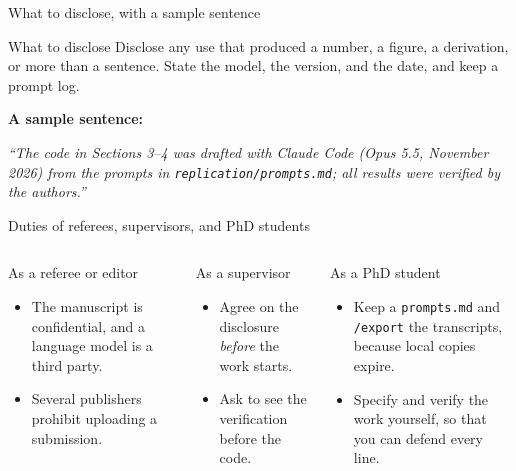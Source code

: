 \documentclass[aspectratio=169,10pt]{beamer}
\begin{document}
\begin{frame}{What to disclose, with a sample sentence}
\begin{block}{What to disclose}
Disclose any use that produced a number, a figure, a derivation, or more than a sentence. State the model, the version, and the date, and keep a prompt log.
\end{block}

\vspace{1.3em}
\textbf{A sample sentence:}

\vspace{0.3em}
{\itshape ``The code in Sections 3--4 was drafted with Claude Code (Opus 5.5, November 2026) from the prompts in \texttt{replication/prompts.md}; all results were verified by the authors.''}
\end{frame}

\begin{frame}{Duties of referees, supervisors, and PhD students}
\begin{columns}[T]
\begin{block}{As a referee or editor}
\begin{itemize}\itemsep5pt
  \item The manuscript is confidential, and a language model is a third party.
  \item Several publishers prohibit uploading a submission.
\end{itemize}
\end{block}
\begin{block}{As a supervisor}
\begin{itemize}\itemsep5pt
  \item Agree on the disclosure \emph{before} the work starts.
  \item Ask to see the verification before the code.
\end{itemize}
\end{block}
\begin{block}{As a PhD student}
\begin{itemize}\itemsep5pt
  \item Keep a \texttt{prompts.md} and \texttt{/export} the transcripts, because local copies expire.
  \item Specify and verify the work yourself, so that you can defend every line.
\end{itemize}
\end{block}
\end{columns}
\end{frame}
\end{document}
